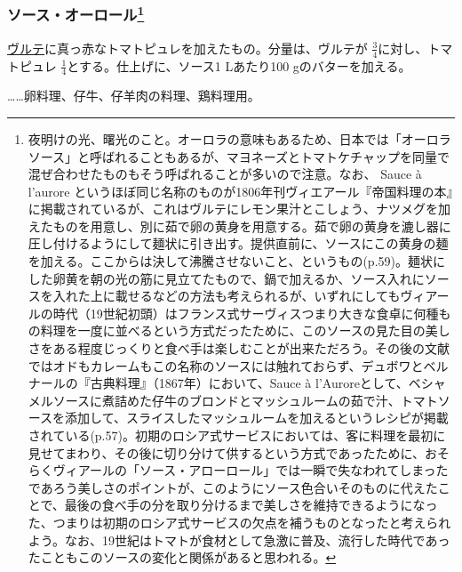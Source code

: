 \begin{recette}
{\subsubsection[ソース・オーロール]{\texorpdfstring{ソース・オーロール\footnote{夜明けの光、曙光のこと。オーロラの意味もあるため、日本では「オーロラソース」と呼ばれることもあるが、マヨネーズとトマトケチャップを同量で混ぜ合わせたものもそう呼ばれることが多いので注意。なお、
  Sauce à l'aurore
  というほぼ同じ名称のものが1806年刊ヴィエアール『帝国料理の本』に掲載されているが、これはヴルテにレモン果汁とこしょう、ナツメグを加えたものを用意し、別に茹で卵の黄身を用意する。茹で卵の黄身を漉し器に圧し付けるようにして麺状に引き出す。提供直前に、ソースにこの黄身の麺を加える。ここからは決して沸騰させないこと、というもの(p.59)。麺状にした卵黄を朝の光の筋に見立てたもので、鍋で加えるか、ソース入れにソースを入れた上に載せるなどの方法も考えられるが、いずれにしてもヴィアールの時代（19世紀初頭）はフランス式サーヴィスつまり大きな食卓に何種もの料理を一度に並べるという方式だったために、このソースの見た目の美しさをある程度じっくりと食べ手は楽しむことが出来ただろう。その後の文献ではオドもカレームもこの名称のソースには触れておらず、デュボワとベルナールの『古典料理』（1867年）において、Sauce
  à
  l'Auroreとして、ベシャメルソースに煮詰めた仔牛のブロンドとマッシュルームの茹で汁、トマトソースを添加して、スライスしたマッシュルームを加えるというレシピが掲載されている(p.57)。初期のロシア式サービスにおいては、客に料理を最初に見せてまわり、その後に切り分けて供するという方式であったために、おそらくヴィアールの「ソース・アローロール」では一瞬で失なわれてしまったであろう美しさのポイントが、このようにソース色合いそのものに代えたことで、最後の食べ手の分を取り分けるまで美しさを維持できるようになった、つまりは初期のロシア式サービスの欠点を補うものとなったと考えられよう。なお、19世紀はトマトが食材として急激に普及、流行した時代であったこともこのソースの変化と関係があると思われる。}}{ソース・オーロール}}\label{sauce-aurore}}


 

\protect\hyperlink{veloute}{ヴルテ}に真っ赤なトマトピュレを加えたもの。分量は、ヴルテが
\(\frac{3}{4}\)に対し、トマトピュレ
\(\frac{1}{4}\)とする。仕上げに、ソース1 Lあたり100 gのバターを加える。

\ldots{}\ldots{}卵料理、仔牛、仔羊肉の料理、鶏料理用。


\end{recette}
